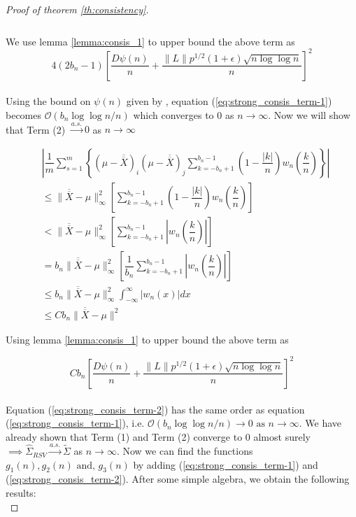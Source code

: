 \documentclass[12pt]{article}
\begin{document}
\begin{proof}[Proof of theorem \ref{th:consistency}]
\begin{align*}
\end{align*}
\\
We use lemma \ref{lemma:consis_1} to upper bound the above term as
\begin{equation} \label{eq:strong_consis_term-1}
    4(2b_n - 1)\left[ \dfrac{D \psi(n)}{n} + \dfrac{\|L\| p^{1/2}(1+\epsilon)\sqrt{n \log\log n}}{n}  \right]^2
\end{equation}
\\
Using the bound on $\psi(n)$ given by \cite{stra:1964}, equation (\ref{eq:strong_consis_term-1}) becomes $\mathcal{O}\left(b_n \log \log n/n\right)$ which converges to 0 as $n \to \infty$. Now we will show that Term (2) $\xrightarrow{a.s.} 0$ as $n\to \infty$

\begin{align*}
    &\left|\dfrac{1}{m}\sum\limits_{s=1}^{m}\left\{(\mu-\overline{\overline{X}})_i(\mu-\overline{\overline{X}})_j\sum_{k=-b_n+1}^{b_n-1}\left(1-\dfrac{|k|}{n}\right)w_n\left(\dfrac{k}{n}\right)\right\}\right|\\
    & \leq\|\overline{\overline{X}} - \mu\|_{\infty}^2\left[\sum_{k=-b_n+1}^{b_n-1}\left(1-\dfrac{|k|}{n}\right)w_n\left(\dfrac{k}{n}\right)\right]\\
    &< \|\overline{\overline{X}} - \mu\|_{\infty}^2\left[\sum_{k=-b_n+1}^{b_n-1}\left|w_n\left(\dfrac{k}{n}\right)\right|\right]\\
    &= b_n\|\overline{\overline{X}} - \mu\|_{\infty}^2\left[\dfrac{1}{b_n}\sum_{k=-b_n+1}^{b_n-1}\left|w_n\left(\dfrac{k}{n}\right)\right|\right]\\
    & \leq b_n\|\overline{\overline{X}} - \mu\|_{\infty}^2 \int_{-\infty}^{\infty}|w_n(x)|dx \\
    & \leq Cb_n\|\overline{\overline{X}} - \mu \|^2
\end{align*}

Using lemma \ref{lemma:consis_1} to upper bound the above term as 

\begin{equation} \label{eq:strong_consis_term-2}
     Cb_n\left[ \dfrac{D \psi(n)}{n} + \dfrac{\|L\| p^{1/2}(1+\epsilon)\sqrt{n \log\log n}}{n}  \right]^2
\end{equation}
\\
Equation (\ref{eq:strong_consis_term-2}) has the same order as equation (\ref{eq:strong_consis_term-1}), i.e. $\mathcal{O}\left(b_n \log \log n/n\right) \to 0 \textrm{ as } n \to \infty$.
We have already shown that Term (1) and Term (2) converge to 0 almost surely $\implies \hat{\Sigma}_{RSV} \xrightarrow{a.s.} \tilde{\Sigma}$ as $n \to \infty$. Now we can find the functions $g_1(n), g_2(n) \textrm{ and, } g_3(n)$ by adding (\ref{eq:strong_consis_term-1}) and (\ref{eq:strong_consis_term-2}). After some simple algebra, we obtain the following results:\\


\end{proof}
\end{document}
